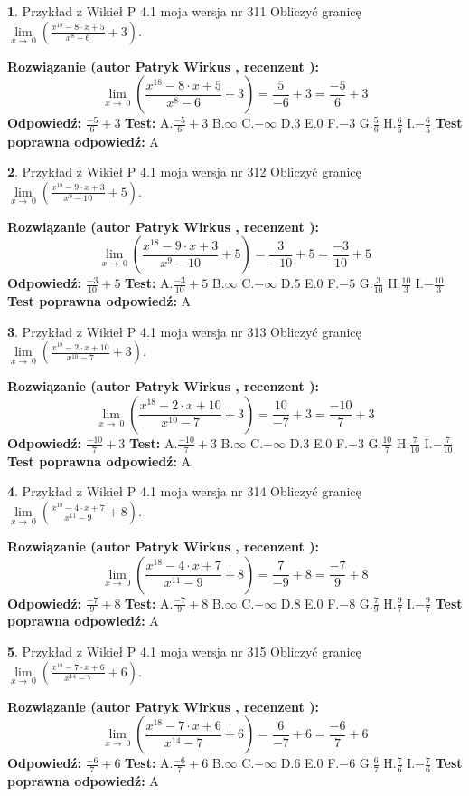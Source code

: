 \documentclass[12pt, a4paper]{article}
\theoremstyle{definition} %
\newtheorem{zad}{}
\newcommand{\zadStart}[1]{\begin{zad}#1\newline}
\newcommand{\zadStop}{\end{zad}}
\newcommand{\rozwStart}[2]{\noindent \textbf{Rozwiązanie (autor #1 , recenzent #2): }\newline}
\newcommand{\rozwStop}{\newline}
\newcommand{\odpStart}{\noindent \textbf{Odpowiedź:}\newline}
\newcommand{\odpStop}{\newline}
\newcommand{\testStart}{\noindent \textbf{Test:}\newline}
\newcommand{\testStop}{\newline}
\newcommand{\kluczStart}{\noindent \textbf{Test poprawna odpowiedź:}\newline}
\newcommand{\kluczStop}{\newline}
\begin{document}
\zadStart{Przykład z Wikieł P 4.1 moja wersja nr 311}
Obliczyć granicę $\lim\limits_{x\to\ 0}(\frac{x^{18}-8 \cdot x +5}{x^{8}-6}+3)$.
\zadStop
\rozwStart{Patryk Wirkus}{}
$$\lim\limits_{x\to\ 0}(\frac{x^{18}-8 \cdot x +5}{x^{8}-6}+3)=\frac{5}{-6}+3=\frac{-5}{6}+3$$
\rozwStop
\odpStart
$\frac{-5}{6}+3$
\odpStop
\testStart
A.$\frac{-5}{6}+3$
B.$\infty$
C.$-\infty$
D.$3$
E.$0$
F.$-3$
G.$\frac{5}{6}$
H.$\frac{6}{5}$
I.$-\frac{6}{5}$
\testStop
\kluczStart
A
\kluczStop



\zadStart{Przykład z Wikieł P 4.1 moja wersja nr 312}
Obliczyć granicę $\lim\limits_{x\to\ 0}(\frac{x^{18}-9 \cdot x +3}{x^{9}-10}+5)$.
\zadStop
\rozwStart{Patryk Wirkus}{}
$$\lim\limits_{x\to\ 0}(\frac{x^{18}-9 \cdot x +3}{x^{9}-10}+5)=\frac{3}{-10}+5=\frac{-3}{10}+5$$
\rozwStop
\odpStart
$\frac{-3}{10}+5$
\odpStop
\testStart
A.$\frac{-3}{10}+5$
B.$\infty$
C.$-\infty$
D.$5$
E.$0$
F.$-5$
G.$\frac{3}{10}$
H.$\frac{10}{3}$
I.$-\frac{10}{3}$
\testStop
\kluczStart
A
\kluczStop



\zadStart{Przykład z Wikieł P 4.1 moja wersja nr 313}
Obliczyć granicę $\lim\limits_{x\to\ 0}(\frac{x^{18}-2 \cdot x +10}{x^{10}-7}+3)$.
\zadStop
\rozwStart{Patryk Wirkus}{}
$$\lim\limits_{x\to\ 0}(\frac{x^{18}-2 \cdot x +10}{x^{10}-7}+3)=\frac{10}{-7}+3=\frac{-10}{7}+3$$
\rozwStop
\odpStart
$\frac{-10}{7}+3$
\odpStop
\testStart
A.$\frac{-10}{7}+3$
B.$\infty$
C.$-\infty$
D.$3$
E.$0$
F.$-3$
G.$\frac{10}{7}$
H.$\frac{7}{10}$
I.$-\frac{7}{10}$
\testStop
\kluczStart
A
\kluczStop



\zadStart{Przykład z Wikieł P 4.1 moja wersja nr 314}
Obliczyć granicę $\lim\limits_{x\to\ 0}(\frac{x^{18}-4 \cdot x +7}{x^{11}-9}+8)$.
\zadStop
\rozwStart{Patryk Wirkus}{}
$$\lim\limits_{x\to\ 0}(\frac{x^{18}-4 \cdot x +7}{x^{11}-9}+8)=\frac{7}{-9}+8=\frac{-7}{9}+8$$
\rozwStop
\odpStart
$\frac{-7}{9}+8$
\odpStop
\testStart
A.$\frac{-7}{9}+8$
B.$\infty$
C.$-\infty$
D.$8$
E.$0$
F.$-8$
G.$\frac{7}{9}$
H.$\frac{9}{7}$
I.$-\frac{9}{7}$
\testStop
\kluczStart
A
\kluczStop



\zadStart{Przykład z Wikieł P 4.1 moja wersja nr 315}
Obliczyć granicę $\lim\limits_{x\to\ 0}(\frac{x^{18}-7 \cdot x +6}{x^{14}-7}+6)$.
\zadStop
\rozwStart{Patryk Wirkus}{}
$$\lim\limits_{x\to\ 0}(\frac{x^{18}-7 \cdot x +6}{x^{14}-7}+6)=\frac{6}{-7}+6=\frac{-6}{7}+6$$
\rozwStop
\odpStart
$\frac{-6}{7}+6$
\odpStop
\testStart
A.$\frac{-6}{7}+6$
B.$\infty$
C.$-\infty$
D.$6$
E.$0$
F.$-6$
G.$\frac{6}{7}$
H.$\frac{7}{6}$
I.$-\frac{7}{6}$
\testStop
\kluczStart
A
\kluczStop
\end{document}
